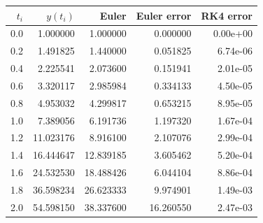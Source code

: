 \begin{tabular}{r r r r r}\hline
$t_i$ & $y(t_i)$ & Euler & Euler error & RK4 error \\
\hline
0.0 & 1.000000 & 1.000000 & 0.000000 & 0.00e+00 \\
0.2 & 1.491825 & 1.440000 & 0.051825 & 6.74e-06 \\
0.4 & 2.225541 & 2.073600 & 0.151941 & 2.01e-05 \\
0.6 & 3.320117 & 2.985984 & 0.334133 & 4.50e-05 \\
0.8 & 4.953032 & 4.299817 & 0.653215 & 8.95e-05 \\
1.0 & 7.389056 & 6.191736 & 1.197320 & 1.67e-04 \\
1.2 & 11.023176 & 8.916100 & 2.107076 & 2.99e-04 \\
1.4 & 16.444647 & 12.839185 & 3.605462 & 5.20e-04 \\
1.6 & 24.532530 & 18.488426 & 6.044104 & 8.86e-04 \\
1.8 & 36.598234 & 26.623333 & 9.974901 & 1.49e-03 \\
2.0 & 54.598150 & 38.337600 & 16.260550 & 2.47e-03 \\
\hline
\end{tabular}

